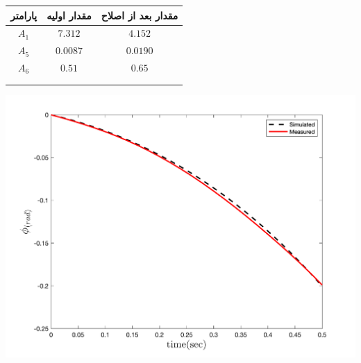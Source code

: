   \begin{minipage}[H]{\linewidth}
	\hfill
	\begin{minipage}[b]{0.49\linewidth}
		\centering
		\begin{tabular}{ccc}\hline
			 پارامتر & مقدار اولیه  & مقدار بعد از اصلاح
			 \\ \hline
			$A_1$  & $7.312$ & $4.152$ \\
			$A_5$ & $0.0087$ & $0.0190$\\
			$A_6$ & $0.51$ & $0.65$\\ \hline
			\\\\
		\end{tabular}
	\end{minipage}
	\begin{minipage}[b]{0.48\linewidth}
		\centering
		\includegraphics[width=1\linewidth]{../Figures/RCP/roll_ml_parameter_estimation/RCP_roll_S2.png}
	\end{minipage}
\end{minipage}

\vspace{0.5cm}
